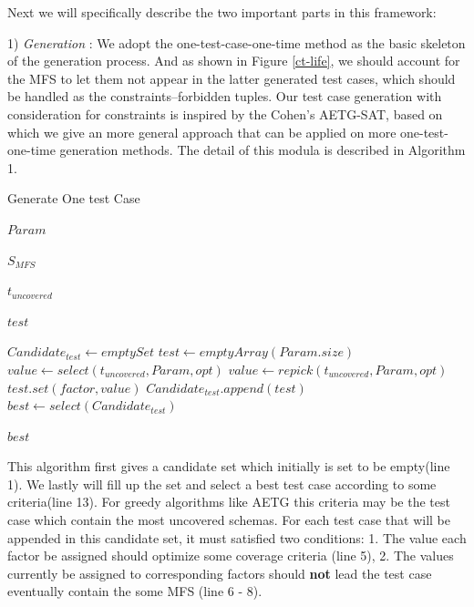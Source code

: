 \documentclass{sig-alternate}
\begin{document}
Next we will specifically describe the two important parts in this framework:

1) \emph{Generation} :
We adopt the one-test-case-one-time method as the basic skeleton of the generation process. And as shown in Figure \ref{ct-life}, we should account for the MFS to let them not appear in the latter generated test cases, which should be handled as the constraints--forbidden tuples. Our test case generation with consideration for constraints is inspired by the Cohen's AETG-SAT, based on which we give an more general approach that can be applied on more one-test-one-time generation methods.  The detail of this modula is described in Algorithm 1.

\begin{algorithm}
  \caption{Generate One test Case}
  \begin{algorithmic}[1]
     \Require
     $Param$ 

     $S_{MFS}$ 

     $t_{uncovered}$ 

     \Ensure  $test$ 

      \State $Candidate_{test} \leftarrow empty Set$
       \State $test \leftarrow emptyArray(Param.size)$
           \State   $value \leftarrow select(t_{uncovered},Param,opt)$
              \State $value \leftarrow repick(t_{uncovered},Param,opt) $
           \EndWhile
           \State $test.set(factor, value)$
       \EndFor
        \State $Candidate_{test}.append(test)$
       \EndWhile
       \State $best \leftarrow select(Candidate_{test})$

     \State \Return $best$
  \end{algorithmic}
\end{algorithm}

This algorithm first gives a candidate set which initially is set to be empty(line 1). We lastly will fill up the set and select a best test case according to some criteria(line 13). For greedy algorithms like AETG this criteria may be the test case which contain the most uncovered schemas. For each test case that will be appended in this candidate set, it must satisfied two conditions: 1. The value each factor be assigned should optimize some coverage criteria (line 5), 2. The values currently be assigned to corresponding factors should \textbf{not} lead the test case eventually contain the some MFS (line 6 - 8).
\end{document}
